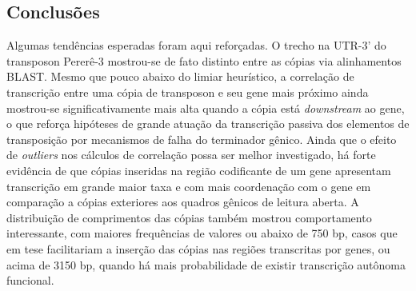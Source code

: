 \documentclass[12pt]{article}
\begin{document}
\begin{multicols}{2}
\section{Conclusões}
Algumas tendências esperadas foram aqui reforçadas. O trecho na UTR-3' do transposon Pererê-3 mostrou-se de fato distinto entre as cópias via alinhamentos BLAST. Mesmo que pouco abaixo do limiar heurístico, a correlação de transcrição entre uma cópia de transposon e seu gene mais próximo ainda mostrou-se significativamente mais alta quando a cópia está \textit{downstream} ao gene, o que reforça hipóteses de grande atuação da transcrição passiva dos elementos de transposição por mecanismos de falha do terminador gênico. Ainda que o efeito de \textit{outliers} nos cálculos de correlação possa ser melhor investigado, há forte evidência de que cópias inseridas na região codificante de um gene apresentam transcrição em grande maior taxa e com mais coordenação com o gene em comparação a cópias exteriores aos quadros gênicos de leitura aberta. A distribuição de comprimentos das cópias também mostrou comportamento interessante, com maiores frequências de valores ou abaixo de 750 bp, casos que em tese facilitariam a inserção das cópias nas regiões transcritas por genes, ou acima de 3150 bp, quando há mais probabilidade de existir transcrição autônoma funcional.

\end{multicols}
\end{document}
